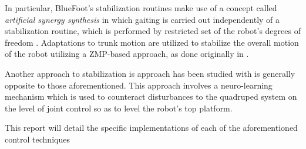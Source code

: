 		In particular, BlueFoot's stabilization routines make use of a concept called \emph{artificial synergy synthesis} in which gaiting is carried out independently of a stabilization routine, which is performed by restricted set of the robot's degrees of freedom \cite{Vuko1972,Yamaguchi1993}. Adaptations to trunk motion are utilized to stabilize the overall motion of the robot utilizing a ZMP-based approach, as done originally in \cite{Yamaguchi1993}.

		Another approach to stabilization is approach has been studied with is generally opposite to those aforementioned. This approach involves a neuro-learning mechanism which is used to counteract disturbances to the quadruped system on the level of joint control so as to level the robot's top platform.
			

		This report will detail the specific implementations of each of the aforementioned control techniques
